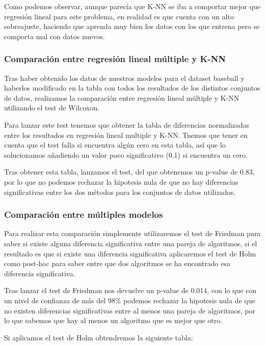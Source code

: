 Como podemos observar, aunque parecía que K-NN se iba a comportar mejor que regresión lineal para este problema, en realidad es que cuenta con un alto sobreajuste, haciendo que aprenda muy bien los datos con los que entrena pero se comporta mal con datos nuevos.

\subsubsection{Comparación entre regresión lineal múltiple y K-NN}

Tras haber obtenido los datos de nuestros modelos para el dataset baseball y haberlos modificado en la tabla con todos los resultados de los distintos conjuntos de datos, realizamos la comparación entre regresión lineal múltiple y K-NN utilizando el test de Wilcoxon.

Para lanzar este test tenemos que obtener la tabla de diferencias normalizadas entre los resultados en regresión lineal multiple y K-NN. Tnemos que tener en cuenta que el test falla si encuentra algún cero en esta tabla, así que lo solucionamos añadiendo un valor poco significativo (0.1) si encuentra un cero.

Tras obtener esta tabla, lanzamos el test, del que obtenemos un p-value de 0.83, por lo que no podemos rechazar la hipotesis nula de que no hay diferencias significativas entre los dos métodos para los conjuntos de datos utilizados.

\subsubsection{Comparación entre múltiples modelos}

Para realizar esta comparación simplemente utilizaremos el test de Friedman para saber si existe alguna diferencia significativa entre una pareja de algoritmos, si el resultado es que si existe una diferencia significativa aplicaremos el test de Holm como post-hoc para saber entre que dos algoritmos se ha encontrado esa diferencia significativa.

Tras lanzar el test de Friedman nos devuelve un p-value de 0.014, con lo que con un nivel de confianza de más del 98\% podemos rechazar la hipotesis nula de que no existen diferencias significativas entre al menos una pareja de algoritmos, por lo que sabemos que hay al menos un algoritmo que es mejor que otro.

Si aplicamos el test de Holm obtendremos la siguiente tabla:

